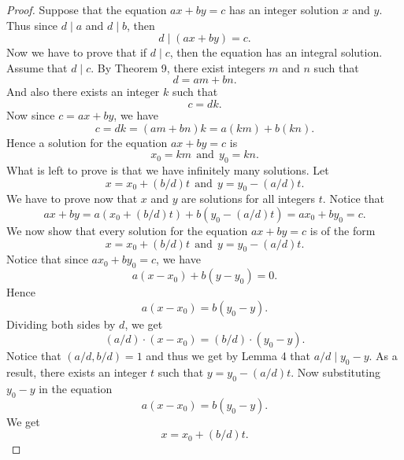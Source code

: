 \documentclass[12pt,letterpaper]{book}
\begin{document}
\begin{proof}
Suppose that the equation $ax+by=c$ has an integer solution $x$ and
$y$.  Thus since $d\mid a$ and $d\mid b$, then
\begin{equation*}
d\mid (ax+by)=c.
\end{equation*}
Now we have to prove that if $d\mid c$, then the equation has
an integral solution.  Assume that $d\mid c$. By Theorem 9, there exist
integers $m$ and $n$ such that
\begin{equation*}
d=am+bn.
\end{equation*}
And also there exists an integer $k$ such that
\begin{equation*}
c=dk.
\end{equation*}
Now since $c=ax+by$, we have
\begin{equation*}
c=dk=(am+bn)k=a(km)+b(kn).
\end{equation*}
Hence a solution for the equation $ax+by=c$ is
\begin{equation*}
x_0=km \ \ \mbox{and} \ \  y_0=kn.
\end{equation*}
What is left to prove is that we have infinitely many solutions.
Let
\begin{equation*}
x=x_0+(b/d)t \ \ \mbox{and} \ \  y=y_0-(a/d)t.
\end{equation*}
We have to prove now that $x$ and $y$ are solutions for all integers
$t$. Notice that
\begin{equation*}
ax+by=a(x_0+(b/d)t)+b(y_0-(a/d)t)=ax_0+by_0=c.
\end{equation*}
We now show that every solution for the equation $ax+by=c$
is of the form
\begin{equation*}
x=x_0+(b/d)t \ \ \mbox{and} \ \  y=y_0-(a/d)t.
\end{equation*}
Notice that since $ax_0+by_0=c$, we have
\begin{equation*}
a(x-x_0)+b(y-y_0)=0.
\end{equation*}
Hence
\begin{equation*}
a(x-x_0)=b(y_0-y).
\end{equation*}
Dividing both sides by $d$, we get
\begin{equation*}
(a/d)\cdot(x-x_0)=(b/d)\cdot(y_0-y).
\end{equation*}
Notice that $(a/d,b/d)=1$ and thus we get by Lemma 4 that $a/d\mid
y_0-y$. As a result, there exists an integer $t$ such that
$y=y_0-(a/d)t$. Now substituting $y_0-y$ in the equation
\begin{equation*}
a(x-x_0)=b(y_0-y).
\end{equation*}
We get
\begin{equation*}
x=x_0+(b/d)t.
\end{equation*}
\end{proof}
\end{document}
